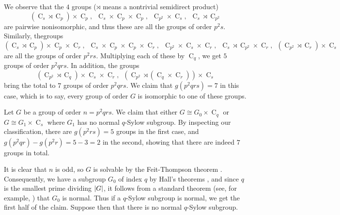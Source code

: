 \documentclass{article}
\newenvironment{enumrealm}{\setlength{\abovedisplayskip}{5pt}
\setlength{\belowdisplayskip}{5pt}}{\setlength{\abovedisplayskip}{10.0pt plus 2.0pt minus 5.0pt}
\setlength{\belowdisplayskip}{10.0pt plus 2.0pt minus 5.0pt}}
\DeclarePairedDelimiter\abs{\lvert}{\rvert}
\newcommand{\cyc}[1]{\operatorname{C}_{#1}}
\theoremstyle{plain}
\theoremstyle{definition}
\begin{document}
We observe that the $4$ groups ($\rtimes$ means a nontrivial semidirect product)
\begin{enumrealm}\begin{equation*}(\cyc{s} \rtimes \cyc{p}) \times \cyc{p},\enspace
\cyc{s} \times \cyc{p} \times \cyc{p},\enspace
\cyc{p^2} \times \cyc{s},\enspace
\cyc{s} \rtimes \cyc{p^2}\end{equation*}\end{enumrealm}
\unpre are pairwise nonisomorphic, and thus these are all the groups of order $p^2 s$. Similarly, the\nolinebreak[4] groups
\begin{enumrealm}\begin{equation*}(\cyc{s} \rtimes \cyc{p}) \times \cyc{p} \times \cyc{r},\enspace
\cyc{s} \times \cyc{p} \times \cyc{p} \times \cyc{r},\enspace
\cyc{p^2} \times \cyc{s} \times \cyc{r},\enspace
\cyc{s} \rtimes \cyc{p^2} \times \cyc{r},\enspace
(\cyc{p^2} \rtimes \cyc{r}) \times \cyc{s}\end{equation*}\end{enumrealm}
\unpre are all the groups of order $p^2 r s$. Multiplying each of these by $\cyc{q}$, we get $5$ groups of order $p^2 q r s$. In addition, the groups
\begin{enumrealm}\begin{equation*}(\cyc{p^2} \rtimes \cyc{q}) \times \cyc{s} \times \cyc{r},\enspace
(\cyc{p^2} \rtimes (\cyc{q} \times \cyc{r})) \times \cyc{s}\end{equation*}\end{enumrealm}
\unpre bring the total to $7$ groups of order $p^2 q r s$. We claim that $g(p^2 q r s) = 7$ in this case, which is to say, every group of order $G$ is isomorphic to one of these groups.

Let $G$ be a group of order $n = p^2 q r s$. We claim that either $G \cong G_0 \times \cyc{q}$ or $G \cong G_1\times \cyc{s}$ where $G_1$ has no normal $q$-Sylow subgroup. By inspecting our classification, there are $g(p^2 r s) = 5$ groups in the first case, and $g(p^2 q r) - g(p^2 r) = 5 - 3 = 2$ in the second, showing that there are indeed $7$ groups in total.

It is clear that $n$ is odd, so $G$ is solvable by the Feit-Thompson theorem {\cite{oddsolve}}. Consequently, we have a subgroup $G_0$ of index $q$ by Hall's theorems {\cite[Thm.~3.13]{fgt}}, and since $q$ is the smallest prime dividing $\abs{G}$, it follows from a standard theorem (see, for example, {\cite[Prob.~1A.1]{fgt}}) that $G_0$ is normal. Thus if a $q$-Sylow subgroup is normal, we get the first half of the claim. Suppose then that there is no normal $q$-Sylow subgroup.
\end{document}
